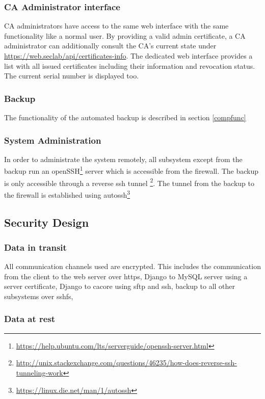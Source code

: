 \documentclass[english]{article}
\begin{document}
 \subsubsection{CA Administrator interface}
 CA administrators have access to the same web interface with the same functionality like a normal user.
 By providing a valid admin certificate, a CA administrator can additionally consult the CA's current state under \url{https://web.seclab/api/certificates-info}. The dedicated web interface provides a list with all issued certificates including their information and revocation status. The current serial number is displayed too.
 
\subsubsection{Backup} 
 The functionality of the automated backup is described in section \ref{compfunc}
 \subsubsection{System Administration}
 In order to administrate the system remotely, all subsystem except from the backup run an openSSH\footnote{\url{https://help.ubuntu.com/lts/serverguide/openssh-server.html}} server which is accessible from the firewall. The backup is only accessible through a reverse ssh tunnel \footnote{\url{http://unix.stackexchange.com/questions/46235/how-does-reverse-ssh-tunneling-work}}. The tunnel from the backup to the firewall is established using autossh\footnote{\url{https://linux.die.net/man/1/autossh}}
 
 

\subsection{Security Design}
\subsubsection{Data in transit}
All communication channels used are encrypted. This includes the communication from  the client to the web server over https, Django to MySQL server using a server certificate, Django to cacore using sftp and ssh, backup to all other subsystems over sshfs, 
\subsubsection{Data at rest}
\end{document}
